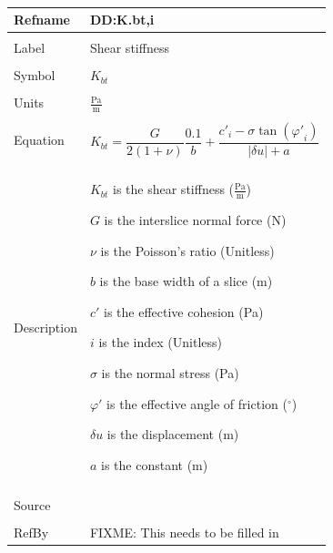 \documentclass[12pt]{article}
\begin{document}
~\newline
\noindent \begin{minipage}{\textwidth}
\begin{tabular}{p{} p{}}
\toprule \textbf{Refname} & \textbf{DD:K.bt,i}
\label{DD:K.bt,i}
\\ \midrule \\
Label & Shear stiffness
\\ \midrule \\
Symbol & ${K_{bt}}$
\\ \midrule \\
Units & $\frac{\text{Pa}}{\text{m}}$
\\ \midrule \\
Equation & \begin{dmath}
           {K_{bt}}=\frac{G}{2 \left(1+ν\right)} \frac{0.1}{b}+\frac{{c'}_{i}-σ \tan\left({φ'}_{i}\right)}{|δu|+a}
           \end{dmath}
\\ \midrule \\
Description & \begin{symbDescription}
              \item{${K_{bt}}$ is the shear stiffness ($\frac{\text{Pa}}{\text{m}}$)}
              \item{$G$ is the interslice normal force (N)}
              \item{$ν$ is the Poisson's ratio (Unitless)}
              \item{$b$ is the base width of a slice (m)}
              \item{$c'$ is the effective cohesion (Pa)}
              \item{$i$ is the index (Unitless)}
              \item{$σ$ is the normal stress (Pa)}
              \item{$φ'$ is the effective angle of friction (${}^{\circ}$)}
              \item{$δu$ is the displacement (m)}
              \item{$a$ is the constant (m)}
              \end{symbDescription}
\\ \midrule \\
Source & 
\\ \midrule \\
RefBy & FIXME: This needs to be filled in
\\ \bottomrule \end{tabular}
\end{minipage}\\
\end{document}
